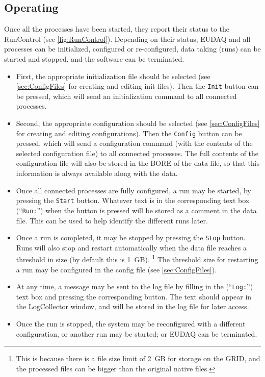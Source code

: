 \subsection{Operating}
Once all the processes have been started, they report their status to the RunControl (see \autoref{fig:RunControl}).
Depending on their status, EUDAQ and all processes can be initialized, configured or re-configured, data taking (runs) can be started and stopped, and the software can be terminated.

\begin{itemize}
\item First, the appropriate initialization file should be selected (see \autoref{sec:ConfigFiles} for creating and editing init-files). Then the \texttt{Init} button can be pressed,
which will send an initialization command to all connected processes.

\item Second, the appropriate configuration should be selected 
  (see \autoref{sec:ConfigFiles} for creating and editing configurations).
Then the \texttt{Config} button can be pressed,
which will send a configuration command
(with the contents of the selected configuration file) to all connected processes.
The full contents of the configuration file will also be stored
in the \gls{BORE} of the data file,
so that this information is always available along with the data.
\item Once all connected processes are fully configured, a run may be started, by pressing the \texttt{Start} button.
Whatever text is in the corresponding text box (``\texttt{Run:}'') when the button is pressed
will be stored as a comment in the data file.
This can be used to help identify the different runs later.
\item Once a run is completed, it may be stopped by pressing the \texttt{Stop} button.
Runs will also stop and restart automatically when the data file reaches a threshold in size (by default this is 1~GB).%
\footnote{This is because there is a file size limit of 2~GB for storage on the GRID,
and the processed files can be bigger than the original native files.}
The threshold size for restarting a run may be configured in the config file (see \autoref{sec:ConfigFiles}).
\item At any time, a message may be sent to the log file by filling in the (``\texttt{Log:}'') text box and pressing the corresponding button.
The text should appear in the LogCollector window, and will be stored in the log file for later access.
\item Once the run is stopped, the system may be reconfigured with a different configuration, or another run may be started; or EUDAQ can be terminated.
  
\end{itemize}
